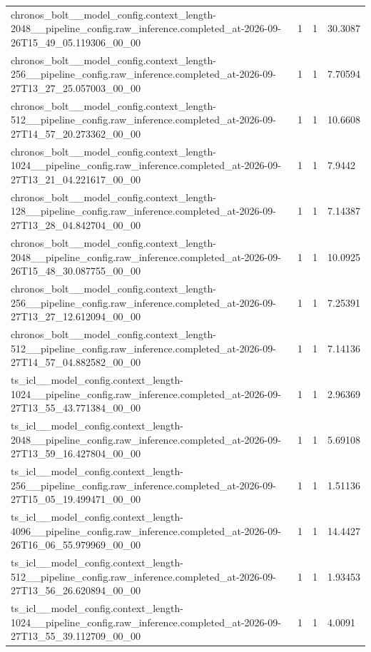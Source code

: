 \begin{tabular}{llll}
chronos\_bolt\_\_model\_config.context\_length-2048\_\_pipeline\_config.raw\_inference.completed\_at-2026-09-26T15\_49\_05.119306\_00\_00 & 1 & 1 & 30.3087 \\
chronos\_bolt\_\_model\_config.context\_length-256\_\_pipeline\_config.raw\_inference.completed\_at-2026-09-27T13\_27\_25.057003\_00\_00 & 1 & 1 & 7.70594 \\
chronos\_bolt\_\_model\_config.context\_length-512\_\_pipeline\_config.raw\_inference.completed\_at-2026-09-27T14\_57\_20.273362\_00\_00 & 1 & 1 & 10.6608 \\
chronos\_bolt\_\_model\_config.context\_length-1024\_\_pipeline\_config.raw\_inference.completed\_at-2026-09-27T13\_21\_04.221617\_00\_00 & 1 & 1 & 7.9442 \\
chronos\_bolt\_\_model\_config.context\_length-128\_\_pipeline\_config.raw\_inference.completed\_at-2026-09-27T13\_28\_04.842704\_00\_00 & 1 & 1 & 7.14387 \\
chronos\_bolt\_\_model\_config.context\_length-2048\_\_pipeline\_config.raw\_inference.completed\_at-2026-09-26T15\_48\_30.087755\_00\_00 & 1 & 1 & 10.0925 \\
chronos\_bolt\_\_model\_config.context\_length-256\_\_pipeline\_config.raw\_inference.completed\_at-2026-09-27T13\_27\_12.612094\_00\_00 & 1 & 1 & 7.25391 \\
chronos\_bolt\_\_model\_config.context\_length-512\_\_pipeline\_config.raw\_inference.completed\_at-2026-09-27T14\_57\_04.882582\_00\_00 & 1 & 1 & 7.14136 \\
ts\_icl\_\_model\_config.context\_length-1024\_\_pipeline\_config.raw\_inference.completed\_at-2026-09-27T13\_55\_43.771384\_00\_00 & 1 & 1 & 2.96369 \\
ts\_icl\_\_model\_config.context\_length-2048\_\_pipeline\_config.raw\_inference.completed\_at-2026-09-27T13\_59\_16.427804\_00\_00 & 1 & 1 & 5.69108 \\
ts\_icl\_\_model\_config.context\_length-256\_\_pipeline\_config.raw\_inference.completed\_at-2026-09-27T15\_05\_19.499471\_00\_00 & 1 & 1 & 1.51136 \\
ts\_icl\_\_model\_config.context\_length-4096\_\_pipeline\_config.raw\_inference.completed\_at-2026-09-26T16\_06\_55.979969\_00\_00 & 1 & 1 & 14.4427 \\
ts\_icl\_\_model\_config.context\_length-512\_\_pipeline\_config.raw\_inference.completed\_at-2026-09-27T13\_56\_26.620894\_00\_00 & 1 & 1 & 1.93453 \\
ts\_icl\_\_model\_config.context\_length-1024\_\_pipeline\_config.raw\_inference.completed\_at-2026-09-27T13\_55\_39.112709\_00\_00 & 1 & 1 & 4.0091 \\

\end{tabular}
